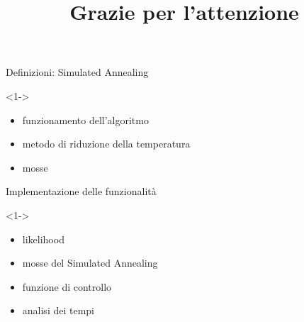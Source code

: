 \documentclass{beamer}
\begin{document}
\begin{tframe}{Definizioni: Simulated Annealing}
  \begin{block}<1->{\ }
    \begin{itemize}
      \item funzionamento dell'algoritmo
      \item metodo di riduzione della temperatura
      \item mosse
    \end{itemize}
  \end{block}
\end{tframe}

\begin{tframe}{Implementazione delle funzionalità}
  \begin{block}<1->{\ }
    \begin{itemize}
      \item likelihood
      \item mosse del Simulated Annealing
      \item funzione di controllo
      \item analisi dei tempi
    \end{itemize}
  \end{block}
\end{tframe}


\title{Grazie per l'attenzione}
\titlepageframe
\end{document}
